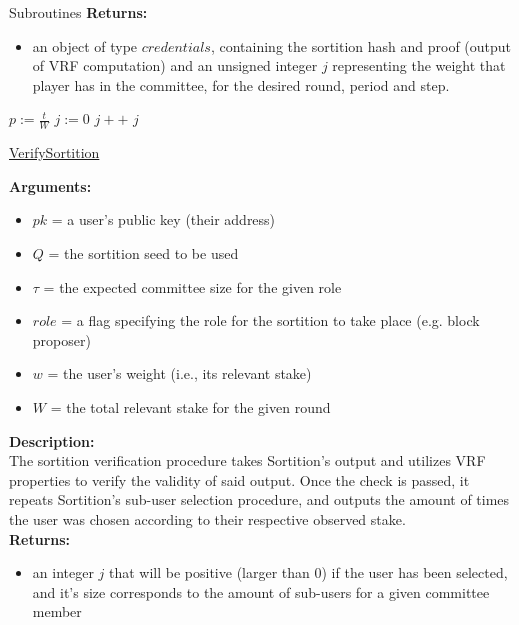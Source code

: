 \documentclass[10pt,a4paper]{article}
\begin{document}
\begin{section}{Subroutines}
\noindent \textbf{Returns:}
\begin{itemize}
    \item an object of type $credentials$, containing the sortition hash and proof (output of VRF
    computation) and an unsigned integer $j$ representing the weight that player has in the committee,
    for the desired round, period and step.
  \end{itemize}



\begin{algorithm}[H]
    \begin{algorithmic}[1]
        \State $p := \frac{t}{W}$
        \State $j := 0$
        \While{$\frac{hash}{2^{hashlen}} \notin [\sum_{k=0}^j\mathsf{B}(k;w,p), \sum_{k=0}^{j+1}\mathsf{B}(k;w,p))$}
            \State $j++$
        \EndWhile
        \Return $j$
    \EndFunction
    \end{algorithmic}
    \caption{\underline{VerifySortition}}
\end{algorithm}

\noindent \textbf{Arguments:}
\begin{itemize}
    \item $pk$ = a user's public key (their address)
    \item $Q$ = the sortition seed to be used
    \item $\tau$ = the expected committee size for the given role
    \item $role$ = a flag specifying the role for the sortition to take place (e.g. block proposer)
    \item $w$ = the user's weight (i.e., its relevant stake)
    \item $W$ = the total relevant stake for the given round
  \end{itemize}

\noindent \textbf{Description:}\\
The sortition verification procedure takes Sortition's output and utilizes 
VRF properties to verify the validity of said output.
Once the check is passed, it repeats Sortition's sub-user selection procedure, 
and outputs the amount of times the user was chosen according to their respective 
observed stake.\\

\noindent \textbf{Returns:}
\begin{itemize}
    \item an integer $j$ that will be positive (larger than 0) if the user has been 
    selected, and it's size corresponds to the amount
    of sub-users for a given committee member
  \end{itemize}


\end{section}
\end{document}
